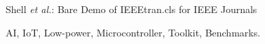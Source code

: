 \documentclass[journal]{IEEEtran}
\begin{document}
%
{Shell \MakeLowercase{\textit{et al.}}: Bare Demo of IEEEtran.cls for IEEE Journals}
% 











\maketitle

\begin{abstract}

\end{abstract}

\begin{IEEEkeywords}
AI, IoT, Low-power, Microcontroller, Toolkit, Benchmarks.
\end{IEEEkeywords}


%
\IEEEpeerreviewmaketitle









\end{document}
